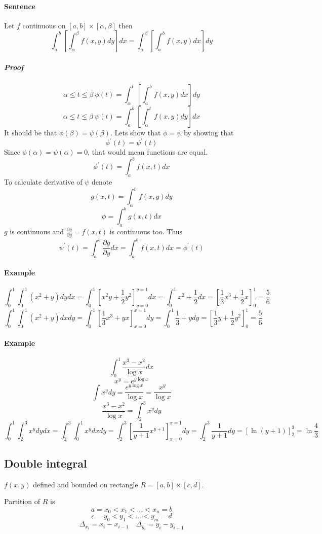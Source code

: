 \paragraph{Sentence}
Let $f$ continuous on $[a,b] \times [\alpha, \beta]$ then
$$\int_a^b \left[\int_\alpha^\beta f(x,y) dy\right] dx = \int_\alpha^\beta\left[\int_a^b  f(x,y) dx\right] dy$$
\subparagraph{Proof}
$$\alpha \leq t \leq \beta \: \phi(t)  = \int_{\alpha}^{t} \left[ \int_a^b f(x,y) dx \right]dy$$
$$\alpha \leq t \leq \beta \: \psi(t)  =\int_a^b  \left[ \int_{\alpha}^{t} f(x,y) dy \right]dx$$
It should be that $\phi(\beta) = \psi(\beta)$. Lets show that $\phi = \psi$ by showing that
$$\phi^\prime (t) = \psi^\prime(t)$$
Since $\phi(\alpha) = \psi(\alpha) = 0$, that would mean functions are equal.
$$\phi^\prime (t) = \int_a^b f(x,t) dx$$
To calculate derivative of $\psi$ denote
$$g(x,t) = \int_{\alpha}^{t} f(x,y) dy$$
$$\phi = \int_a^b g(x,t) dx$$
$g$ is continuous and $\frac{\partial g}{\partial y} = f(x,t)$ is continuous too. Thus
$$\psi^\prime (t) = \int_a^b \frac{\partial g}{\partial y} dx = \int_a^b f(x,t) dx = \phi^\prime(t)$$
\paragraph{Example}
$$\int_0^1\int_0^1 (x^2+y)dydx = \int_0^1 \left[x^2y+\frac{1}{2}y^2\right]^{y=1}_{y=0}dx = \int_0^1 x^2+\frac{1}{2} dx = \left[\frac{1}{3}x^3+\frac{1}{2}x\right]_0^1 = \frac{5}{6}$$
$$\int_0^1\int_0^1 (x^2+y)dxdy = \int_0^1 \left[\frac{1}{3}x^3+yx\right]^{x=1}_{x=0}dy = \int_0^1 \frac{1}{3} + y dy = \left[\frac{1}{3}y+\frac{1}{2}y^2\right]_0^1 = \frac{5}{6}$$
\paragraph{Example}
$$\int_0^1 \frac{x^3-x^2}{\log x} dx$$
$$x^y = e^{y\log x}$$
$$\int x^y dy= \frac{e^{y\log x}}{\log x} = \frac{x^y}{\log x} $$
$$\frac{x^3-x^2}{\log x}  =\int_2^3 x^y dy$$
$$\int_0^1 \int_2^3 x^y dy dx =\int_2^3 \int_0^1  x^y  dx dy = \int_2^3  \left[\frac{1}{y+1}x^{y+1}\right]_{x=0}^{x=1}  dy = \int_2^3  \frac{1}{y+1}  dy = \left[\ln (y+1)\right]_2^3 = \ln \frac{4}{3}$$

\subsection{Double integral}
$f(x,y)$ defined and bounded on rectangle $R=[a,b]\times [c,d]$.

Partition of $R$ is
$$a = x_0 < x_1 < \dots < x_n  = b$$
$$c = y_0 < y_1 < \dots < y_m  = d$$
$$\Delta_{x_i} = x_i - x_{i-1} \quad \Delta_{y_i} = y_i - y_{i-1}$$

